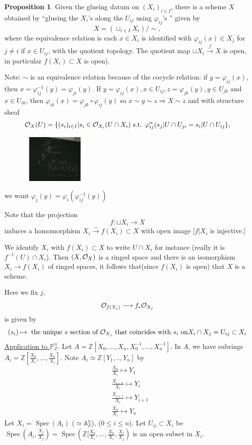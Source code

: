 \documentclass[11pt]{article}
\theoremstyle{definition}
\newtheorem{prop}[thm]{Proposition}
\newcommand{\spec}{\text{ Spec}\,}
\newcommand{\affn}{\mathbb A}
\newcommand{\proj}{\mathbb P}
\newcommand{\intg}{\mathbb Z}
\newcommand{\calo}{{\cal O}}
\newcommand{\Lrta}{\Longrightarrow}
\newcommand{\lrta}{\longrightarrow}
\begin{document}
\begin{prop}
Given the glueing datum on $(X_i)_{i\in I}$, there is a scheme $X$ obtained by ``glueing the $X_i$'s along the $U_{ij}$ using $\varphi_{ij}$'s '' given by 
$$
X=\left(\sqcup_{i\in I}X_i\right)/\sim,
$$
where the equivalence relation is each $x\in X_i$ is identified with $\varphi_{ij}(x)\in X_{j}$ for $j\neq i$ if $x\in U_{ij}$, with the quotient topology. The quotient map $\sqcup X_i\overset{f}{\lrta} X$ is open, in particular $f(X_i)\subset X$ is open).

Note: $\sim$ is an equivalence relation because of the cocycle relation: if $y=\varphi_{ij}(x)$, then $x=\varphi_{ij}^{-1}(y)=\varphi_{ji}(y)$. If $y=\varphi_{ij}(x),x\in U_{ij},z=\varphi_{jk}(y), y\in U_{jk}$ and $x\in U_{ik}$, then $\varphi_{ik}(x)=\varphi_{jk}\circ \varphi_{ij}(y)$ so $x\sim y\sim z\Lrta X\sim z$ and with structure sheaf
$$
\calo_X(U)=\{(s_i)_{i\in I}|s_i\in \calo_{X_i}(U\cap X_i) \text{ s.t. } \varphi_{ij}^{\alpha}(s_{j}|U\cap U_{ji}=s_i|U\cap U_{ij}\},
$$
\begin{figure}[h]
\includegraphics[width=0.3\textwidth]{pic2Aprl27.pdf}
\end{figure}
we want
$\varphi_j(y)=\varphi_i(\varphi_{ij}^{-1}(y))$
\end{prop}
Note that the projection 
$$
f:\sqcup X_i\lrta X
$$ induces a homomorphism
$X_i\overset{\sim}{\lrta} f(X_i)\subset X$ with open image [$f|X_i$ is injective.]

We identify $X_i$ with $f(X_i)\subset X$ to write $U\cap X_i$ for instance (really it is $f^{-1}(U)\cap X_i$). Then $(X,\calo_X)$ is a ringed space  and there is an isomorphism 
$X_i\lrta f(X_i)$ of ringed spaces, it follows that(since $f(X_i)$ is open) that $X$ is a scheme.

Here we fix $j$,
$$
\calo_{f(X_j)}\lrta f_*\calo_{X_j}
$$
is given by 
$$
(s_i)\mapsto \text{ the unique $s$ section of $\calo_{X_j}$ that coincides with $s_i$ on} X_i\cap X_j=U_{ij}\subset X_i
$$
\underline{Application to } $\proj^n_\intg$. Let $A=\intg[X_0,...,X_n, X_0^{-1},...,X_n^{-1}]$. In $A$, we have subrings $A_i=\intg[\frac{X_0}{X_i},...,\frac{X_n}{X_i}]$. Note $A_i\simeq \intg[Y_1,..,Y_n]$ by 
$$
\begin{aligned}
&\frac{X_0}{X_i}\mapsto Y_1\\
&\frac{X_{i-1}}{X_i}\mapsto Y_{i}\\
&\frac{X_{i+1}}{X_i}\mapsto Y_{i+1}\\
&\frac{X_n}{X_i}\mapsto Y_n
\end{aligned}
$$
Let $X_i=\spec(A_i)$ ($\simeq \affn^n_\intg$), ($0\leq i \leq n$). Let $U_{ij}\subset X_i$ be $\spec(A_i,\frac{X_j}{X_j})=\spec (\intg[\frac{X_0}{X_i},...,\frac{X_n}{X_i},\frac{X_i}{X_j})$ is an open subset in $X_i$.
\end{document}
